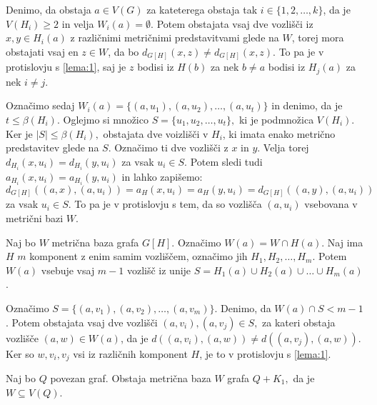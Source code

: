 \documentclass[mat1, tisk]{fmfdelo}
\newcommand{\1}{(1, 1, \ldots, 1)}
\newcommand{\2}{(2, 2, \ldots, 2)}
\begin{document}
\begin{dokaz}
    Denimo, da obstaja $a \in V(G)$ za kateterega obstaja tak $i \in \{1, 2, \ldots, k\}$, da je
    $V(H_i) \geq 2$ in velja $ W_i(a) = \emptyset$. Potem obstajata vsaj dve vozlišči iz $x, y \in H_i(a)$ z različnimi
    metričnimi predstavitvami glede na $W$, torej mora obstajati vsaj en $z \in W$, da bo $d_{G[H]}(x, z) \neq d_{G[H]}(x,z).$ 
    To pa je v protislovju s \ref{lema:1}, saj je $z$ bodisi iz $H(b)$ za nek $b \neq a$ bodisi iz $H_j(a)$ za nek $i\neq j$.

    Označimo sedaj $W_i(a) = \{ (a, u_1), (a, u_2), \ldots , (a, u_t)\}$ in denimo, da je $t \leq \beta(H_i).$
    Oglejmo si množico $S = \{u_1, u_2, \ldots, u_t\},$ ki je podmnožica $V(H_i).$ Ker je $|S| \leq \beta(H_i),$
    obstajata dve voizlišči v $H_i$, ki imata enako metrično predstavitev glede na $S$. Označimo ti dve vozlišči
    z $x$ in $y$. Velja torej $d_{H_i}(x, u_i) = d_{H_i}(y, u_i)$ za vsak $u_i \in S$. Potem sledi tudi
    $a_{H_i}(x, u_i) = a_{H_i}(y, u_i)$ in lahko zapišemo:
    $$d_{G[H]}((a, x), (a, u_i)) = a_H(x, u_i) = a_H(y, u_i) = d_{G[H]}((a, y), (a, u_i))$$ za vsak $u_i \in S.$
    To pa je v protislovju s tem, da so vozlišča $(a, u_i)$ vsebovana v metrični bazi $W$.
\end{dokaz}


\begin{trditev}\label{trditev:mbaza_vsebovanost_vozlisc_iz_komponent_H}
    Naj bo $W$ metrična baza grafa $G[H]$. Označimo $W(a) = W \cap H(a).$ Naj ima $H$ $m$
    komponent z enim samim vozliščem, označimo jih $H_1, H_2, \ldots, H_m$. Potem $W(a)$ vsebuje vsaj $m-1$ 
    vozlišč iz unije $ S = H_1(a) \cup H_2(a) \cup \ldots \cup H_m(a)$.
\end{trditev}

\begin{dokaz}
    Označimo $S = \{(a, v_1), (a, v_2), \ldots, (a, v_m)\}$.
    Denimo, da $W(a) \cap S < m-1$. Potem obstajata vsaj dve vozlišči $(a, v_i), (a, v_j) \in S,$ 
    za kateri obstaja vozlišče $(a, w) \in W(a)$, da je
    $d((a, v_i), (a, w)) \neq d((a, v_j), (a, w)).$  
    Ker so $w, v_i, v_j$ vsi iz različnih komponent $H$, je to v protislovju s \ref{lema:1}.
\end{dokaz}


\begin{lema} \label{lema:2}
    Naj bo $Q$ povezan graf. Obstaja metrična baza $W$ grafa $Q + K_1,$ da je 
    $W \subseteq V(Q).$
\end{lema}
\end{document}
